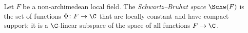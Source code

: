 Let $F$ be a non-archimedean local field. The \emph{Schwartz--Bruhat space} $\Schw(F)$ is the set of functions
$\Phi\colon F\to\C$ that are locally constant and have compact support; it is a $\C$-linear subspace of the space of
all functions $F\to\C$.
